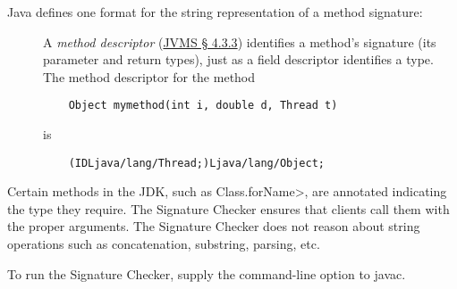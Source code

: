 Java defines one format for the string representation of a method signature:

\begin{description}

\item[]
  A \emph{method descriptor} (\href{https://docs.oracle.com/javase/specs/jvms/se11/html/jvms-4.html#jvms-4.3.3}{JVMS \S
    4.3.3}) identifies a method's signature (its parameter and return
  types), just as a field descriptor identifies a
  type.   The method descriptor for the method
\begin{Verbatim}
    Object mymethod(int i, double d, Thread t)
\end{Verbatim}
\noindent is
\begin{Verbatim}
    (IDLjava/lang/Thread;)Ljava/lang/Object;
\end{Verbatim}

\end{description}



Certain methods in the JDK, such as \<Class.forName>, are annotated
indicating the type they require.  The Signature Checker ensures that
clients call them with the proper arguments.  The Signature Checker does
not reason about string operations such as concatenation, substring,
parsing, etc.

\begin{sloppypar}
To run the Signature Checker, supply the
command-line option to javac.
\end{sloppypar}


